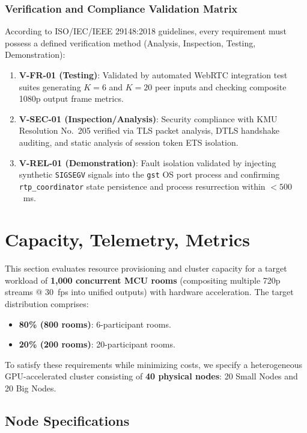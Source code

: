 \documentclass{article}
\begin{document}
\subsubsection{Verification and Compliance Validation Matrix}

According to ISO/IEC/IEEE 29148:2018 guidelines, every requirement must possess a defined verification method (Analysis, Inspection, Testing, Demonstration):

\begin{enumerate}
    \item \textbf{V-FR-01 (Testing)}: Validated by automated WebRTC integration test suites generating $K=6$ and $K=20$ peer inputs and checking composite 1080p output frame metrics.
    \item \textbf{V-SEC-01 (Inspection/Analysis)}: Security compliance with KMU Resolution No.~205 verified via TLS packet analysis, DTLS handshake auditing, and static analysis of session token ETS isolation.
    \item \textbf{V-REL-01 (Demonstration)}: Fault isolation validated by injecting synthetic \texttt{SIGSEGV} signals into the \texttt{gst} OS port process and confirming \texttt{rtp\_coordinator} state persistence and process resurrection within $< 500$~ms.
\end{enumerate}

\newpage
\section{Capacity, Telemetry, Metrics}

This section evaluates resource provisioning and cluster capacity for a target
workload of \textbf{1,000 concurrent MCU rooms} (compositing multiple 720p streams @ 30~fps into
unified outputs) with hardware acceleration. The target distribution comprises:
\begin{itemize}
    \item \textbf{80\% (800 rooms)}: 6-participant rooms.
    \item \textbf{20\% (200 rooms)}: 20-participant rooms.
\end{itemize}

To satisfy these requirements while minimizing costs, we specify a heterogeneous GPU-accelerated
cluster consisting of \textbf{40 physical nodes}: 20 Small Nodes and 20 Big Nodes.

\subsection{Node Specifications}
\end{document}
